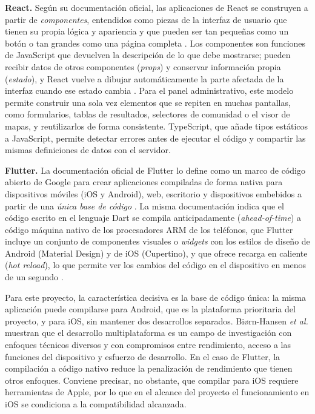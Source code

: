 \textbf{React.} Según su documentación oficial, las aplicaciones de React se construyen a partir de \textit{componentes}, entendidos como piezas de la interfaz de usuario que tienen su propia lógica y apariencia y que pueden ser tan pequeñas como un botón o tan grandes como una página completa \cite{react2026docs}. Los componentes son funciones de JavaScript que devuelven la descripción de lo que debe mostrarse; pueden recibir datos de otros componentes (\textit{props}) y conservar información propia (\textit{estado}), y React vuelve a dibujar automáticamente la parte afectada de la interfaz cuando ese estado cambia \cite{react2026docs}. Para el panel administrativo, este modelo permite construir una sola vez elementos que se repiten en muchas pantallas, como formularios, tablas de resultados, selectores de comunidad o el visor de mapas, y reutilizarlos de forma consistente. TypeScript, que añade tipos estáticos a JavaScript, permite detectar errores antes de ejecutar el código y compartir las mismas definiciones de datos con el servidor.

\textbf{Flutter.} La documentación oficial de Flutter lo define como un marco de código abierto de Google para crear aplicaciones compiladas de forma nativa para dispositivos móviles (iOS y Android), web, escritorio y dispositivos embebidos a partir de una \textit{única base de código} \cite{flutter2026docs}. La misma documentación indica que el código escrito en el lenguaje Dart se compila anticipadamente (\textit{ahead-of-time}) a código máquina nativo de los procesadores ARM de los teléfonos, que Flutter incluye un conjunto de componentes visuales o \textit{widgets} con los estilos de diseño de Android (Material Design) y de iOS (Cupertino), y que ofrece recarga en caliente (\textit{hot reload}), lo que permite ver los cambios del código en el dispositivo en menos de un segundo \cite{flutter2026docs}.

Para este proyecto, la característica decisiva es la base de código única: la misma aplicación puede compilarse para Android, que es la plataforma prioritaria del proyecto, y para iOS, sin mantener dos desarrollos separados. Biørn-Hansen \textit{et al.} \cite{biorn2019cross} muestran que el desarrollo multiplataforma es un campo de investigación con enfoques técnicos diversos y con compromisos entre rendimiento, acceso a las funciones del dispositivo y esfuerzo de desarrollo. En el caso de Flutter, la compilación a código nativo reduce la penalización de rendimiento que tienen otros enfoques. Conviene precisar, no obstante, que compilar para iOS requiere herramientas de Apple, por lo que en el alcance del proyecto el funcionamiento en iOS se condiciona a la compatibilidad alcanzada.


